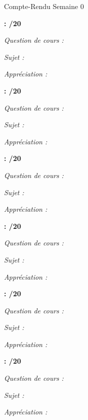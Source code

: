 \documentclass{article}
\begin{document}
\bigskip

\begin{center}\Large
Compte-Rendu Semaine 0
\end{center}

\bigskip

\noindent \textbf{ : /20}

\textit{Question de cours :} 

\textit{Sujet :} 

\textit{Appréciation :} 

\smallskip

\noindent \textbf{ : /20}

\textit{Question de cours :} 

\textit{Sujet :} 

\textit{Appréciation :} 

\smallskip

\noindent \textbf{ : /20}

\textit{Question de cours :} 

\textit{Sujet :} 

\textit{Appréciation :} 

\smallskip

\noindent \textbf{ : /20}

\textit{Question de cours :} 

\textit{Sujet :} 

\textit{Appréciation :} 

\smallskip

\noindent \textbf{ : /20}

\textit{Question de cours :} 

\textit{Sujet :} 

\textit{Appréciation :} 

\smallskip

\noindent \textbf{ : /20}

\textit{Question de cours :} 

\textit{Sujet :} 

\textit{Appréciation :} 
\end{document}
